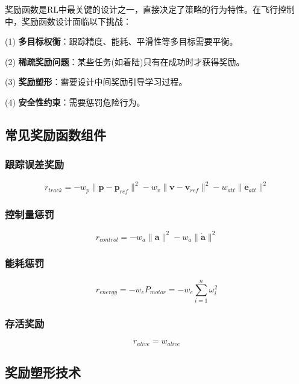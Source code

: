 奖励函数是RL中最关键的设计之一，直接决定了策略的行为特性。在飞行控制中，奖励函数设计面临以下挑战：

(1) \textbf{多目标权衡}：跟踪精度、能耗、平滑性等多目标需要平衡。

(2) \textbf{稀疏奖励问题}：某些任务(如着陆)只有在成功时才获得奖励。

(3) \textbf{奖励塑形}：需要设计中间奖励引导学习过程。

(4) \textbf{安全性约束}：需要惩罚危险行为。

\subsection{常见奖励函数组件}

\subsubsection{跟踪误差奖励}
\begin{equation}
r_{track} = -w_p\|\mathbf{p} - \mathbf{p}_{ref}\|^2 - w_v\|\mathbf{v} - \mathbf{v}_{ref}\|^2 - w_{att}\|\mathbf{e}_{att}\|^2
\end{equation}

\subsubsection{控制量惩罚}
\begin{equation}
r_{control} = -w_a\|\mathbf{a}\|^2 - w_{\dot{a}}\|\dot{\mathbf{a}}\|^2
\end{equation}

\subsubsection{能耗惩罚}
\begin{equation}
r_{energy} = -w_e P_{motor} = -w_e \sum_{i=1}^{n} \omega_i^2
\end{equation}

\subsubsection{存活奖励}
\begin{equation}
r_{alive} = w_{alive}
\end{equation}

\subsection{奖励塑形技术}

